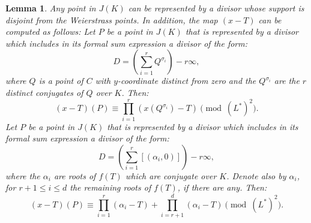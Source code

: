 \documentclass[a4paper, 12pt]{amsart}
\theoremstyle{definition}
\theoremstyle{plain}
\theoremstyle{plain}
\theoremstyle{plain}
\newtheorem{lemma0}[defn0]{Lemma}
\theoremstyle{plain}
\theoremstyle{remark}
\theoremstyle{remark}
\theoremstyle{plain}
\newenvironment{lemma}{ \begin{lemma0}}{\end{lemma0}}
\begin{document}
	\begin{lemma}\label{x-Tdeformation}
		Any point in $J(K)$ can be represented by a divisor whose support is disjoint from the Weierstrass points. In addition, the map $(x-T)$ can be computed as follows:
		Let $P$ be a point in $J(K)$ that is represented by a divisor which includes in its formal sum expression a divisor of the form:
		\begin{equation*}
			D=\left(\sum_{i=1}^r Q^{\sigma_i}\right) -r\infty,
		\end{equation*}
		where $Q$ is a point of $C$ with $y$-coordinate distinct from zero and the $Q^{\sigma_i}$ are the $r$ distinct conjugates of $Q$ over $K$. Then:
		\begin{equation*}
			(x-T)(P)\equiv \prod_{i=1}^r(x(Q^{\sigma_i})-T)\pmod{(L^*)^2}.
		\end{equation*}
		Let $P$ be a point in $J(K)$ that is represented by a divisor which includes in its formal sum expression a divisor of the form:
		\begin{equation*}
			D=\left(\sum_{i=1}^r [(\alpha_i,0)]\right) -r\infty,
		\end{equation*}
		where the $\alpha_i$ are roots of $f(T)$ which are conjugate over $K$. Denote also by $\alpha_i$, for $r+1\le i\le d$ the remaining roots of $f(T)$, if there are any. Then:
		\begin{equation*}
			(x-T)(P)\equiv \prod_{i=1}^r (\alpha_i-T)+\prod_{i=r+1}^d (\alpha_i-T)\pmod{(L^*)^2}.
		\end{equation*}
	\end{lemma}
\end{document}
